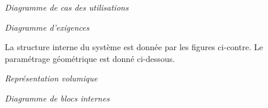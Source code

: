 \documentclass[10pt]{article}
\begin{document}
\begin{minipage}[c]{.33\linewidth}
\begin{center}

\textit{Diagramme de cas des utilisations}
\end{center}
\end{minipage} \hfill
\begin{minipage}[c]{.63\linewidth}
\begin{center}

\textit{Diagramme d'exigences}
\end{center}
\end{minipage}

\vspace{.25cm}

La structure interne du système est donnée par les figures ci-contre. Le paramétrage géométrique est donné ci-dessous.

\vspace{.25cm}


\begin{minipage}[c]{.3\linewidth}
\begin{center}

\textit{Représentation volumique}
\end{center}
\end{minipage}
 \hfill
\begin{minipage}[c]{.65\linewidth}
\begin{center}

\textit{Diagramme de blocs internes}
\end{center}
\end{minipage}
\end{document}
